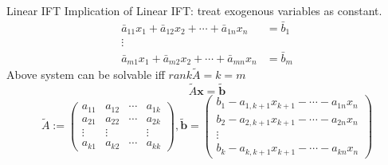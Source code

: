 \documentclass[final]{beamer}
\begin{document}
\begin{frame}[t]{Linear IFT}
	Implication of Linear IFT: treat exogenous variables as constant. 
	\begin{align*}
		\bar a_{11} x_1 + \bar a_{12}x_2 + \cdots + \bar a_{1n}x_n &= \bar b_1\\
		\vdots\\
		\bar a_{m1} x_1 + \bar a_{m2}x_2 + \cdots + \bar a_{mn}x_n &= \bar b_m
	\end{align*}
	Above system can be solvable iff $rank \tilde{A} = k = m$
	\[
		\tilde{A}\mathbf{x} = \tilde{\mathbf{b}}
	\]
	\[
		\tilde{A}:= \begin{pmatrix}
			a_{11}&a_{12}&\cdots&a_{1k}\\
			a_{21}&a_{22}&\cdots&a_{2k}\\
			\vdots&\vdots&&\vdots\\
			a_{k1}&a_{k2}&\cdots&a_{kk}
		\end{pmatrix}, \tilde{\mathbf{b}}=\begin{pmatrix}
			b_1 - a_{1,k+1}x_{k+1} - \cdots - a_{1n}x_n\\
			b_2 - a_{2,k+1}x_{k+1} - \cdots - a_{2n}x_n\\
			\vdots\\
			b_k - a_{k,k+1}x_{k+1} - \cdots - a_{kn}x_n
		\end{pmatrix}
	\]
\end{frame}
\end{document}
